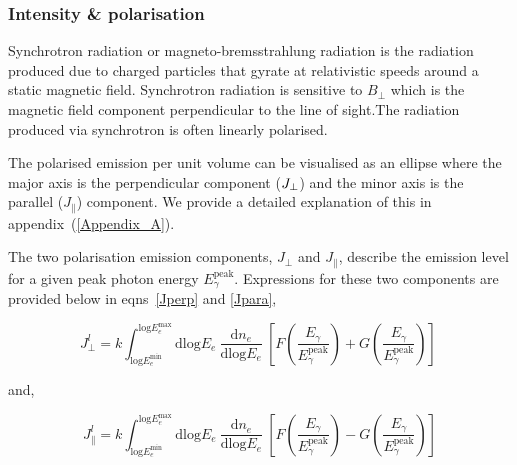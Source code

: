 \documentclass[usenatbib]{mnras}
\begin{document}
\subsubsection{Intensity \& polarisation}
Synchrotron radiation or magneto-bremsstrahlung radiation is the radiation produced due to charged particles that gyrate at relativistic speeds around a static magnetic field. Synchrotron radiation is sensitive to $B_{\perp}$ which is the magnetic field component perpendicular to the line of sight.The radiation produced via synchrotron is often linearly polarised. 

The polarised emission per unit volume can be visualised as an ellipse where the major axis is the perpendicular component ($J_{\rm \perp}$) and the minor axis is the parallel ($J_{\parallel}$) component. We provide a detailed explanation of this in appendix~(\ref{Appendix_A}). 

The two polarisation emission components, $J_{\perp}$ and $J_{\parallel}$, describe the emission level for a  given peak photon energy $E_{\gamma}^{\mathrm{peak}}$. Expressions for these two components are provided below in eqns~\ref{Jperp} and \ref{Jpara},

\begin{equation}
 {J_{\perp}^l} = k  \int_{\mathrm{log}E_e^{\mathrm{min}}}^{\mathrm{log}E_e^{\mathrm{max}}}\mathrm{dlog}E_{e} \  \frac{\mathrm{d}n_e}{\mathrm{dlog}E_{e}} \  \left[F\left(\frac{E_{\gamma}}{E_{\gamma}^{\mathrm{peak}}}\right) + G\left(\frac{E_{\gamma}}{E_{\gamma}^{\mathrm{peak}}}\right)\right] \
 \label{Jperp}
\end{equation}

and,

\begin{equation}
{J_{\parallel}^l} = k \int_{\mathrm{log}E_e^{\mathrm{min}}}^{\mathrm{log}E_e^{\mathrm{max}}}\mathrm{dlog}E_{e} \ \frac{\mathrm{d}n_e}{\mathrm{dlog}E_{e}} \  \left[F\left(\frac{E_{\gamma}}{E_{\gamma}^{\mathrm{peak}}}\right) - G\left(\frac{E_{\gamma}}{E_{\gamma}^{\mathrm{peak}}}\right)\right] 
\label{Jpara}
\end{equation}
\end{document}
